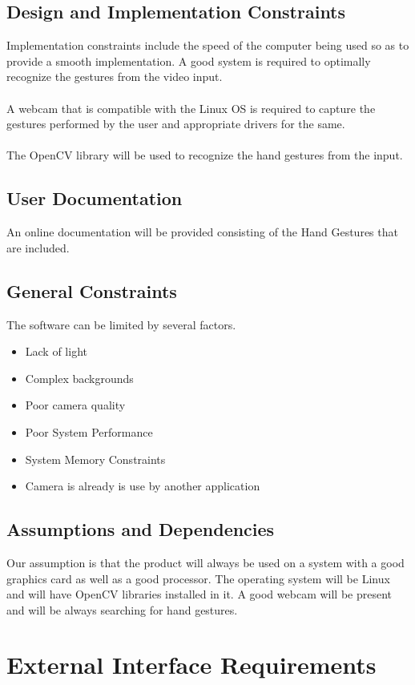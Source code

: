 \documentclass[11pt]{report}
\begin{document}
\subsection{Design and Implementation Constraints}
Implementation constraints include the speed of the computer being used so as to provide a smooth implementation. A good system is required to optimally recognize the gestures from the video input. 
\\
\\A webcam that is compatible with the Linux OS is required to capture the gestures performed by the user and appropriate drivers for the same.
\\
\\The OpenCV library will be used to recognize the hand gestures from the input.


\subsection{User Documentation}
An online documentation will be provided consisting of the Hand Gestures that are included.

\subsection{General Constraints}
The software can be limited by several factors.
\begin{itemize}
    \item Lack of light
    \item Complex backgrounds
    \item Poor camera quality
    \item Poor System Performance
    \item System Memory Constraints
    \item Camera is already is use by another application
\end{itemize}

\subsection{Assumptions and Dependencies}
Our assumption is that the product will always be used on a system with a good graphics card as well as a good processor. The operating system will be Linux and will have OpenCV libraries installed in it.
A good webcam will be present and will be always searching for hand gestures.



\newpage
\section{External Interface Requirements}
\end{document}
